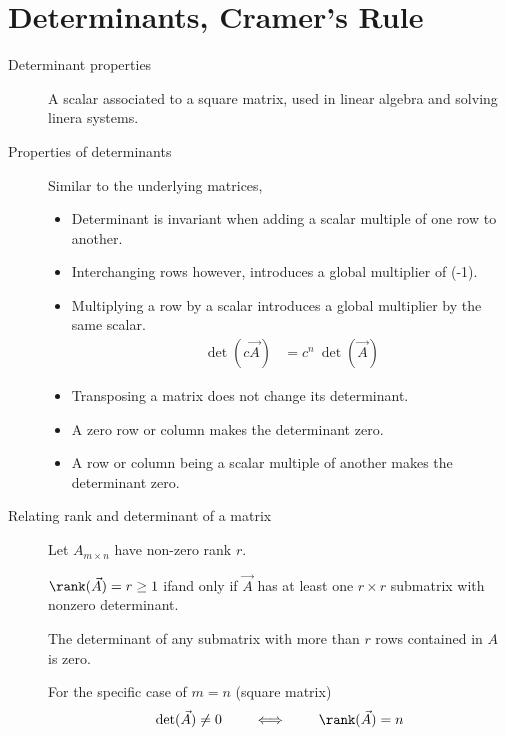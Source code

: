 \section{Determinants, Cramer's Rule}
\begin{description}
    \item[Determinant properties] A scalar associated to a square matrix, used in linear
        algebra and solving linera systems.
    \item[Properties of determinants] Similar to the underlying matrices,
        \begin{itemize}
            \item Determinant is invariant when adding a scalar multiple of one row
                  to another.
            \item Interchanging rows however, introduces a global multiplier of (-1).
            \item Multiplying a row by a scalar introduces a global multiplier by
                  the same scalar.\begin{align}
                      \det(c\vec{A}) & = c^n\ \det(\vec{A})
                  \end{align}
            \item Transposing a matrix does not change its determinant.
            \item A zero row or column makes the determinant zero.
            \item A row or column being a scalar multiple of another makes the
                  determinant zero.
        \end{itemize}

    \item[Relating rank and determinant of a matrix] Let $ A_{m \times n} $ have non-zero
        rank $ r $. \par
        $ \rank(\vec{A}) = r \geq 1 $ ifand only if $ \vec{A} $ has at least one
        $ r \times r $ submatrix with nonzero determinant. \par
        The determinant of any submatrix with more than $ r $ rows contained in $ A $
        is zero. \par
        For the specific case of $ m = n $ (square matrix)
        \begin{align}
            \det(\vec{A}) \neq 0 \qquad \iff \qquad \rank(\vec{A})  = n
        \end{align}


\end{description}
